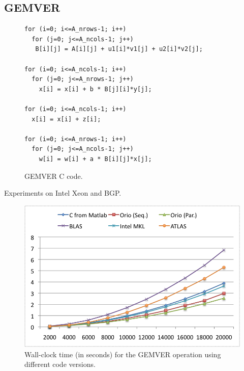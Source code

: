 \documentclass[11pt]{article}
\begin{document}
\subsection{GEMVER}



\begin{figure}[htb]
\centering
\scriptsize
\begin{verbatim}
for (i=0; i<=A_nrows-1; i++)
  for (j=0; j<=A_ncols-1; j++)
   B[i][j] = A[i][j] + u1[i]*v1[j] + u2[i]*v2[j];

for (i=0; i<=A_ncols-1; i++)
  for (j=0; j<=A_nrows-1; j++)
    x[i] = x[i] + b * B[j][i]*y[j];

for (i=0; i<=A_ncols-1; i++)
  x[i] = x[i] + z[i];

for (i=0; i<=A_nrows-1; i++)
  for (j=0; j<=A_ncols-1; j++)
    w[i] = w[i] + a * B[i][j]*x[j];
\end{verbatim}
\caption{GEMVER C code.}
\label{fig:gemver}
\end{figure}

%


Experiments on Intel Xeon and BGP.

\begin{figure}[htp]
\centering
\includegraphics[width=.8\textwidth]{figures/gemver.png}
\caption{Wall-clock time (in seconds) for the GEMVER operation using different code versions.}
\label{fig:gemver}
\end{figure}
\end{document}
